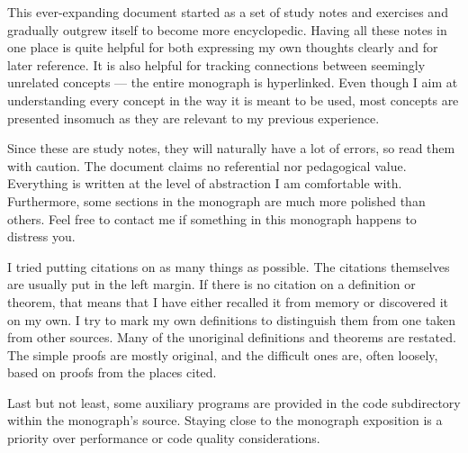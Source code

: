
This ever-expanding document started as a set of study notes and exercises and gradually outgrew itself to become more encyclopedic. Having all these notes in one place is quite helpful for both expressing my own thoughts clearly and for later reference. It is also helpful for tracking connections between seemingly unrelated concepts --- the entire monograph is hyperlinked. Even though I aim at understanding every concept in the way it is meant to be used, most concepts are presented insomuch as they are relevant to my previous experience.

Since these are study notes, they will naturally have a lot of errors, so read them with caution. The document claims no referential nor pedagogical value. Everything is written at the level of abstraction I am comfortable with. Furthermore, some sections in the monograph are much more polished than others. Feel free to contact me if something in this monograph happens to distress you.

I tried putting citations on as many things as possible. The citations themselves are usually put in the left margin. If there is no citation on a definition or theorem, that means that I have either recalled it from memory or discovered it on my own. I try to mark my own definitions to distinguish them from one taken from other sources. Many of the unoriginal definitions and theorems are restated. The simple proofs are mostly original, and the difficult ones are, often loosely, based on proofs from the places cited.

Last but not least, some auxiliary programs are provided in the code subdirectory within the monograph's source. Staying close to the monograph exposition is a priority over performance or code quality considerations.

